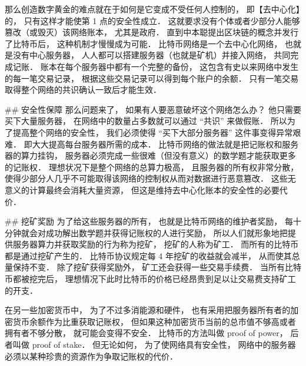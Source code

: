 那么创造数字黄金的难点就在于如何是它变成不受任何人控制的， 即【去中心化】的， 只有这样才能使第 1 点的安全性成立． 这就要求没有个体或者少部分人能够篡改（或毁灭）该网络账本， 尤其是政府． 直到中本聪提出区块链的概念并发行了比特币后， 这种机制才慢慢成为可能． 比特币网络是一个去中心化网络， 也就是没有中心服务器， 人人都可以搭建服务器（也就是矿机）并接入网络， 共同完成记账． 账本在每个服务器中都有一个完整的备份， 这包含有史以来网络中发生的每一笔交易记录， 根据这些交易记录可以得到每个账户的余额． 只有一笔交易取得整个网络的共识确认一致后才能生效．

## 安全性保障
那么问题来了， 如果有人要恶意破坏这个网络怎么办？ 他只需要买下大量服务器， 在网络中的数量占多数就可以通过 “共识” 来做假账． 所以为了提高整个网络的安全性， 我们必须使得 “买下大部分服务器” 这件事变得异常艰难． 即大大提高每台服务器所需的成本． 比特币网络的做法就是把记账权和服务器的算力挂钩， 服务器必须完成一些很难（但没有意义）的数学题才能获取更多的记账权． 理想状况下是整个网络的总算力极高， 且服务器的所有权非常分散， 使得少部分人几乎不可能取得该网络的控制权从而对数据进行恶意篡改． 这些无意义的计算最终会消耗大量资源， 但这是维持去中心化账本的安全性的必要代价．

## 挖矿奖励
为了给这些服务器的所有， 也就是比特币网络的维护者奖励， 每十分钟就会对成功解出数学题并获得记账权的人进行奖励， 所以人们就形象地把提供服务器算力并获取奖励的行为称为挖矿， 挖矿的人称为矿工． 而所有的比特币都是通过挖矿产生的． 比特币协议规定每 4 年挖矿的收益就会减半， 从而使其总量保持不变． 除了挖矿获得奖励外， 矿工还会获得一些交易手续费． 当所有比特币都被挖完后， 理想情况下此时比特币的价格已经昂贵到足以让交易费支持矿工的开支．

在另一些加密货币中， 为了不过多消能源和硬件， 也有采用把服务器所有者的加密货币余额作为比重获取记账权， 但如果这种加密货币当前的总市值不够高或者拥有者不够分散， 就可能会变得不安全． 比特币的方法叫做 proof of power， 后者叫做 proof of stake． 但无论如何， 为了使网络具有安全性， 网络中的服务器必须以某种珍贵的资源作为争取记账权的代价．
